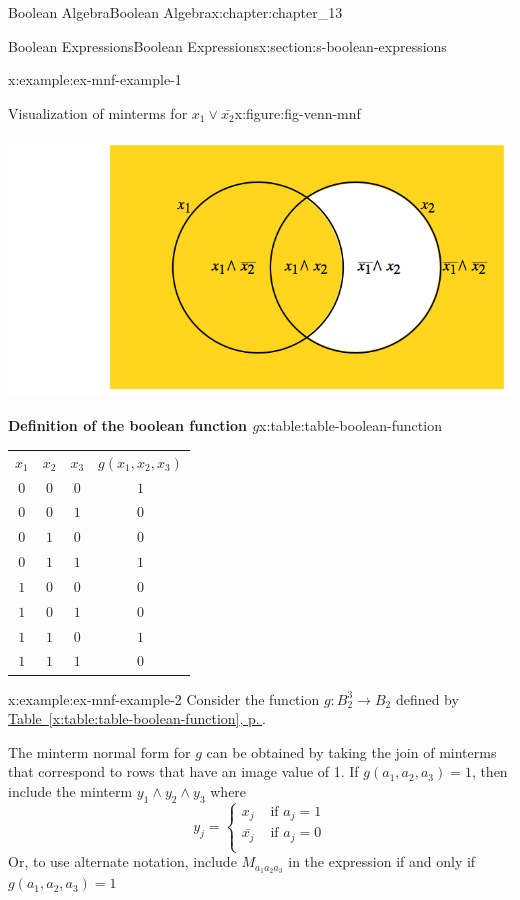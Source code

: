 \documentclass[twoside,10pt,]{book}
\newcommand{\tabularfont}{\relax}
\newcommand{\xreffont}{\relax}
\numberwithin{equation}{section}
\newcommand{\hrulethick} {\noalign{\hrule height 0.11em}}
\begin{document}
\begin{chapterptx}{Boolean Algebra}{}{Boolean Algebra}{}{}{x:chapter:chapter_13}
\begin{sectionptx}{Boolean Expressions}{}{Boolean Expressions}{}{}{x:section:s-boolean-expressions}
\begin{example}{}{x:example:ex-mnf-example-1}
\begin{figureptx}{Visualization of minterms for \(x_1 \lor \bar{x_2}\)}{x:figure:fig-venn-mnf}{}
\begin{image}{0.15}{0.7}{0.15}
\includegraphics[width=\linewidth]{images/fig-venn-mnf.png}
\end{image}%
\tcblower
\end{figureptx}%
\end{example}
\begin{tableptx}{\textbf{Definition of the boolean function \(g\)}}{x:table:table-boolean-function}{}%
\centering
{\tabularfont%
\begin{tabular}{cccc}\hrulethick
\(x_1\)&\(x_2\)&\(x_3\)&\(g\left(x_1, x_2, x_3\right)\)\tabularnewline[0pt]
\(0\)&\(0\)&\(0\)&\(1\)\tabularnewline[0pt]
\(0\)&\(0\)&\(1\)&\(0\)\tabularnewline[0pt]
\(0\)&\(1\)&\(0\)&\(0\)\tabularnewline[0pt]
\(0\)&\(1\)&\(1\)&\(1\)\tabularnewline[0pt]
\(1\)&\(0\)&\(0\)&\(0\)\tabularnewline[0pt]
\(1\)&\(0\)&\(1\)&\(0\)\tabularnewline[0pt]
\(1\)&\(1\)&\(0\)&\(1\)\tabularnewline[0pt]
\(1\)&\(1\)&\(1\)&\(0\)
\end{tabular}
}%
\end{tableptx}%
\begin{example}{}{x:example:ex-mnf-example-2}%
Consider the function \(g:B_2^3 \to B_2\) defined by \hyperref[x:table:table-boolean-function]{Table~{\xreffont\ref{x:table:table-boolean-function}}, p.\,\pageref{x:table:table-boolean-function}}.%
\par
The minterm normal form for \(g\) can be obtained by taking the join of minterms that correspond to rows that have an image value of 1. If \(g\left(a_1, a_2, a_3\right)=1\), then include the minterm \(y_1\land y_2\land y_3\) where%
\begin{equation*}
y_j=\begin{cases}
x_j & \textrm{ if } a_j=1 \\
\bar{x_j} & \textrm{ if } a_j=0\\
\end{cases}
\end{equation*}
Or, to use alternate notation, include \(M_{a_1a_2a_3}\) in the expression if and only if \(g\left(a_1, a_2, a_3\right)=1\)%

\end{example}
\end{sectionptx}
\end{chapterptx}
\end{document}
